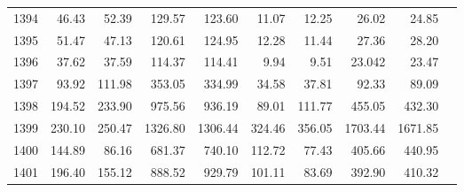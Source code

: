 \documentclass[border=0.2cm]{standalone}
\begin{document}
\begin{tabular}{lrrrrrrrrr}
    1394        & 46.43                               & 52.39                                     & 129.57                            & 123.60                         & 11.07  & 12.25  & 26.02   & 24.85   \\
    1395        & 51.47                               & 47.13                                     & 120.61                            & 124.95                         & 12.28  & 11.44  & 27.36   & 28.20   \\
    1396        & 37.62                               & 37.59                                     & 114.37                            & 114.41                         & 9.94   & 9.51   & 23.042  & 23.47   \\
    1397        & 93.92                               & 111.98                                    & 353.05                            & 334.99                         & 34.58  & 37.81  & 92.33   & 89.09   \\
    1398        & 194.52                              & 233.90                                    & 975.56                            & 936.19                         & 89.01  & 111.77 & 455.05  & 432.30  \\
    1399        & 230.10                              & 250.47                                    & 1326.80                           & 1306.44                        & 324.46 & 356.05 & 1703.44 & 1671.85 \\
    1400        & 144.89                              & 86.16                                     & 681.37                            & 740.10                         & 112.72 & 77.43  & 405.66  & 440.95  \\
    1401        & 196.40                              & 155.12                                    & 888.52                            & 929.79                         & 101.11 & 83.69  & 392.90  & 410.32  \\
    \bottomrule
\end{tabular}
\end{document}
